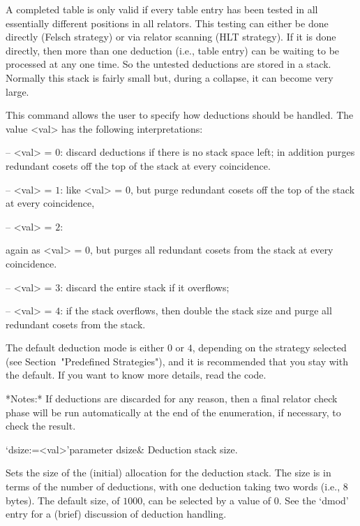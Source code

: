 A completed table  is only valid if every table  entry has been tested
in all essentially different  positions in all relators.  This testing
can either be done directly  (Felsch strategy) or via relator scanning
(HLT strategy).  If it is  done directly, then more than one deduction
(i.e., table  entry) can be waiting  to be processed at  any one time.
So the untested deductions are stored in a stack.  Normally this stack
is fairly small but, during a collapse, it can become very large.

This command allows the user to specify how
deductions should be handled.  The value <val> has the following
interpretations: 

\beginitems

\item{--} <val>  = $0$:  
discard deductions if there is no stack space left; in addition purges
redundant cosets off the top of the stack at every coincidence.

\item{--} <val> = $1$: 
like <val> = $0$, but purge  redundant cosets off the top of the stack
at every coincidence,

\item{--} <val> = $2$: 

again as <val> = 0, but  purges all redundant cosets from the stack at
every coincidence.

\item{--} <val> = $3$:
 discard the entire stack if it overflows;

\item{--} <val> = $4$:
if  the stack  overflows, then  double the  stack size  and  purge all
redundant cosets from the stack.

\enditems

The  default deduction mode  is either  $0$ or  $4$, depending  on the
strategy  selected (see  Section~"Predefined Strategies"),  and  it is
recommended that you stay with the  default.  If you want to know more
details, read the code.

*Notes:*
If deductions are discarded for any reason, then a final relator check
phase  will be run  automatically at  the end  of the  enumeration, if
necessary, to check the result.

\>`dsize:=<val>'{parameter dsize}&
Deduction stack size.

Sets the  size of  the (initial) allocation  for the  deduction stack.
The size is  in terms of the number of  deductions, with one deduction
taking two words (i.e., 8 bytes).  The default size, of $1000$, can be
selected  by  a value  of  0.   See the  `dmod'  entry  for a  (brief)
discussion of deduction handling.


